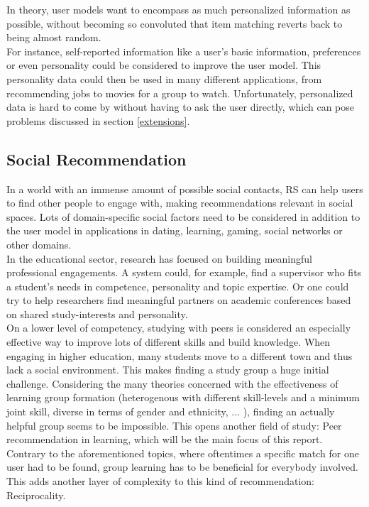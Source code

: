 \documentclass[conference]{IEEEtran}
\begin{document}
In theory, user models want to encompass as much personalized information as possible, without becoming so convoluted that item matching reverts back to being almost random. \cite{olakanmi2017group}\\
For instance, self-reported information like a user's basic information, preferences or even personality could be considered to improve the user model. \cite{nunes2012personality} This personality data could then be used in many different applications, from recommending jobs to movies for a group to watch. \cite{costa1995persons, recio2009personality} Unfortunately, personalized data is hard to come by without having to ask the user directly, which can pose problems discussed in section \ref{extensions}.\\

\subsection{Social Recommendation}\label{rw:socialrec}
In a world with an immense amount of possible social contacts, RS can help users to find other people to engage with, making recommendations relevant in social spaces. Lots of domain-specific social factors need to be considered in addition to the user model in applications in dating, learning, gaming, social networks or other domains.\\ 
In the educational sector, research has focused on building meaningful professional engagements. A system could, for example, find a supervisor who fits a student's needs in competence, personality and topic expertise. \cite{zhang2016personality} Or one could try to help researchers find meaningful partners on academic conferences based on shared study-interests and personality. \cite{asabere2017improving}\\
On a lower level of competency, studying with peers is considered an especially effective way to improve lots of different skills and build knowledge. \cite{maxwell2008learning} When engaging in higher education, many students move to a different town and thus lack a social environment. This makes finding a study group a huge initial challenge. Considering the many theories concerned with the effectiveness of learning group formation (heterogenous with different skill-levels and a minimum joint skill, diverse in terms of gender and ethnicity, ... \cite{manske2015using, blumenfeld1996learning}), finding an actually helpful group seems to be impossible. This opens another field of study: Peer recommendation in learning, which will be the main focus of this report. \cite{potts2018reciprocal, olakanmi2017group}\\
Contrary to the aforementioned topics, where oftentimes a specific match for one user had to be found, group learning has to be beneficial for everybody involved. This adds another layer of complexity to this kind of recommendation: Reciprocality.\\
\end{document}
